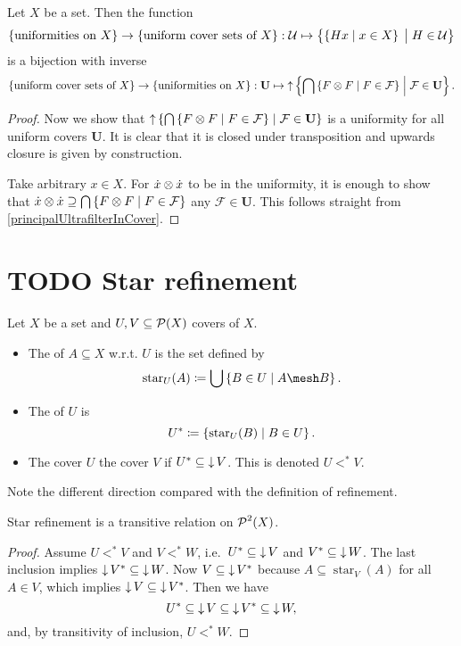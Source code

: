\begin{proposition}
Let $X$ be a set. Then the function
\[ \{\text{uniformities on $X$}\} \to \{\text{uniform cover sets of $X$}\}: \mathcal{U} \mapsto \left\{ \left\{ Hx \;\middle|\; x\in X \right\}\big. \;\middle|\; H\in \mathcal{U} \right\} \]
is a bijection with inverse
\[ \{\text{uniform cover sets of $X$}\} \to \{\text{uniformities on $X$}\}: \mathbf{U} \mapsto \operatorname{\uparrow}\left\{ \bigcap \left\{ F \otimes F \;\middle|\; F\in \mathcal{F} \right\} \;\middle|\; \mathcal{F}\in \mathbf{U} \right\}. \]
\end{proposition}
\begin{proof}


Now we show that $\operatorname{\uparrow}\left\{ \bigcap \left\{ F \otimes F \;\middle|\; F\in \mathcal{F} \right\} \;\middle|\; \mathcal{F}\in \mathbf{U} \right\}$ is a uniformity for all uniform covers $\mathbf{U}$. It is clear that it is closed under transposition and upwards closure is given by construction.

Take arbitrary $x\in X$. For $\dot{x}\otimes\dot{x}$ to be in the uniformity, it is enough to show that $\dot{x}\otimes\dot{x} \supseteq \bigcap\left\{ F\otimes F \;\middle|\; F\in\mathcal{F} \right\}$ any $\mathcal{F}\in\mathbf{U}$. This follows straight from \ref{principalUltrafilterInCover}.
\end{proof}


\section{TODO Star refinement}
\begin{definition}
Let $X$ be a set and $U,V\subseteq \operatorname{\mathcal{P}}(X)$ covers of $X$.
\begin{itemize}
\item The  of $A\subseteq X$ w.r.t. $U$ is the set defined by
\[ \operatorname{star}_U(A) \defeq \bigcup\setbuilder{B\in U}{A\mesh B}. \]
\item The  of $U$ is
\[ U^* \coloneqq \left\{ \operatorname{star}_U(B) \;\middle|\; B\in U \right\}. \]
\item The cover $U$  the cover $V$ if $U^*\subseteq \operatorname{\downarrow} V$. This is denoted $U <^* V$.
\end{itemize}
\end{definition}
Note the different direction compared with the definition of refinement.

\begin{lemma}
Star refinement is a transitive relation on $\operatorname{\mathcal{P}}^2(X)$.
\end{lemma}
\begin{proof}
Assume $U <^* V$ and $V<^* W$, i.e.\ $U^* \subseteq \operatorname{\downarrow} V$ and $V^* \subseteq \operatorname{\downarrow} W$. The last inclusion implies $\operatorname{\downarrow} V^* \subseteq \operatorname{\downarrow} W$. Now $V\subseteq \operatorname{\downarrow} V^*$ because $A\subseteq \operatorname{star}_V(A)$ for all $A\in V$, which implies $\operatorname{\downarrow} V\subseteq \operatorname{\downarrow} V^*$. Then we have
\[ U^* \subseteq \operatorname{\downarrow} V \subseteq \operatorname{\downarrow} V^* \subseteq \operatorname{\downarrow} W, \]
and, by transitivity of inclusion, $U <^* W$.
\end{proof}

